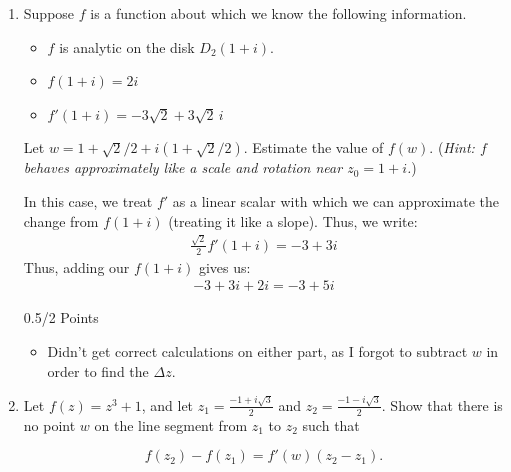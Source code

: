 \begin{enumerate}
    \item Suppose $f$ is a function about which we know the following information.
    	\begin{itemize}
    	\item $f$ is analytic on the disk $D_2(1+i)$.
    	\item $f(1+i) = 2i$
    	\item $f'(1+i) = -3\sqrt{2} +3\sqrt{2}\,i$
    	\end{itemize}
    Let $w = 1+\sqrt{2}/2 +i(1+\sqrt{2}/2)$. Estimate the value of $f(w)$. ({\it Hint: $f$ behaves approximately like a scale and rotation near $z_0=1+i$.})
	\begin{problem}
		In this case, we treat $f'$ as a linear scalar with which we can approximate the change from $f(1+i)$ (treating it like a slope). Thus, we write:
		\begin{align*}
			\frac{\sqrt{2}}2f'(1+i) = -3 + 3i
		\end{align*}
		Thus, adding our $f(1+i)$ gives us:
		\begin{align*}
			-3+3i + 2i = -3 + 5i
		\end{align*}
	\end{problem}
	\begin{grade}
		0.5/2 Points
		\begin{itemize}[itemsep=0pt, parsep=0pt]
			\item Didn't get correct calculations on either part, as I forgot to subtract $w$ in order to find the $\Delta z$. 
		\end{itemize}
	\end{grade}
    
    \item Let $f(z) =z^3+1$, and let $z_1 = \frac{-1+i\sqrt{3}}{2}$ and $z_2 =\frac{-1-i\sqrt{3}}{2}$. Show that there is no point $w$ on the line segment from $z_1$ to $z_2$ such that

    \[f(z_2) - f(z_1) = f'(w)(z_2-z_1).\]


\end{enumerate}

